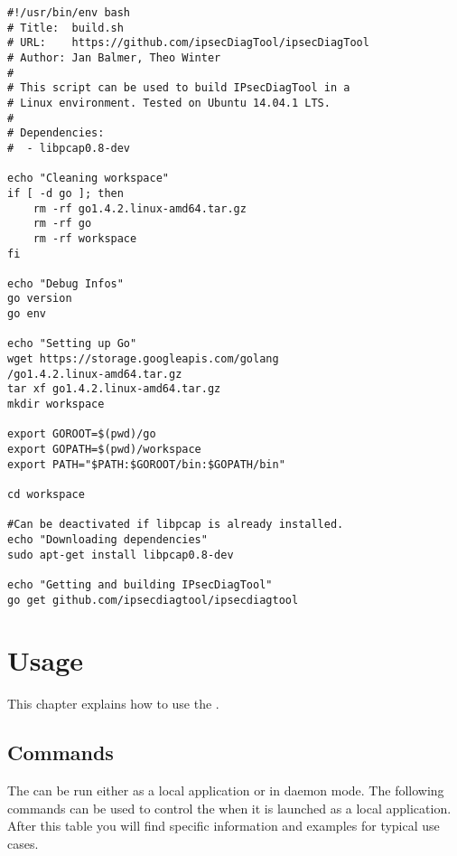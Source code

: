 \lstset{language=bash, breaklines=true}
\begin{lstlisting}
#!/usr/bin/env bash
# Title:  build.sh                                       
# URL:    https://github.com/ipsecDiagTool/ipsecDiagTool
# Author: Jan Balmer, Theo Winter
#    
# This script can be used to build IPsecDiagTool in a
# Linux environment. Tested on Ubuntu 14.04.1 LTS.
#
# Dependencies:
#  - libpcap0.8-dev

echo "Cleaning workspace"
if [ -d go ]; then
	rm -rf go1.4.2.linux-amd64.tar.gz
	rm -rf go
    rm -rf workspace
fi

echo "Debug Infos"
go version
go env

echo "Setting up Go"
wget https://storage.googleapis.com/golang
/go1.4.2.linux-amd64.tar.gz
tar xf go1.4.2.linux-amd64.tar.gz
mkdir workspace

export GOROOT=$(pwd)/go
export GOPATH=$(pwd)/workspace
export PATH="$PATH:$GOROOT/bin:$GOPATH/bin"

cd workspace

#Can be deactivated if libpcap is already installed.
echo "Downloading dependencies"
sudo apt-get install libpcap0.8-dev

echo "Getting and building IPsecDiagTool"
go get github.com/ipsecdiagtool/ipsecdiagtool
\end{lstlisting}


\section{Usage}
This chapter explains how to use the \entool{}.

\subsection{Commands}
The \entool{} can be run either as a local application or in daemon mode. The following commands can be used to control the \entool{} when it is launched as a local application. After this table you will find specific information and examples for typical use cases.

